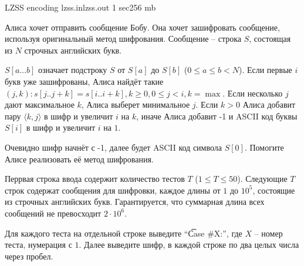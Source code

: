 
\begin{problem}{LZSS encoding}
{lzss.in}{lzss.out}
{1 sec}{256 mb}{}

Алиса хочет отправить сообщение Бобу.
Она хочет зашифровать сообщение, используя оригинальный метод шифрования.
Сообщение -- строка $S$, состоящая из $N$ строчных английских букв.

$S[a\dots b]$ означает подстроку $S$ от $S[a]$ до $S[b]$ ($0 \le a \le b < N$). 
Если первые $i$ букв уже зашифрованы, Алиса найдёт такие $(j, k) \colon s[j..j+k] = s[i..i+k], k \ge 0, 0 \le j < i, k = \max$.
Если несколько $j$ дают максимальное $k$, Алиса выберет минимальное $j$.
Если $k > 0$ Алиса добавит пару $\langle k, j \rangle$ в шифр и увеличит $i$ на $k$, иначе
Алиса добавит -1 и ASCII код буквы $S[i]$ в шифр и увеличит $i$ на $1$.

Очевидно шифр начнёт с -1, далее будет ASCII код символа $S[0]$.
Помогите Алисе реализовать её метод шифрования.

\InputFile

Перрвая строка ввода содержит количество тестов $T$ ($1 \le T \le 50$). 
Следующие $T$ строк содержат сообщения для шифровки, каждое длины от $1$ до $10^5$, состоящие из строчных английских букв. 
Гарантируется, что суммарная длина всех сообщений не превосходит $2 \cdot 10^6$.

\OutputFile

Для каждого теста на отдельной строке выведите ``\t{Case \#{}X:}'', где $X$ -- номер теста, нумерация с $1$. 
Далее выведите шифр, в каждой строке по два целых числа через пробел.

\Examples

\begin{example}
%
\end{example}

\end{problem}
